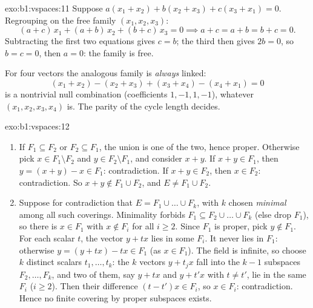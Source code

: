 \begin{solution}{exo:b1:vspaces:11}
Suppose $a(x_1 + x_2) + b(x_2 + x_3) + c(x_3 + x_1) = 0$.
Regrouping on the free family $(x_1, x_2, x_3)$:
\[
(a + c)\,x_1 + (a + b)\,x_2 + (b + c)\,x_3 = 0
\implies a + c = a + b = b + c = 0 .
\]
Subtracting the first two equations gives $c = b$; the third then
gives $2b = 0$, so $b = c = 0$, then $a = 0$: the family is free.

For four vectors the analogous family is \emph{always} linked:
\[
(x_1 + x_2) - (x_2 + x_3) + (x_3 + x_4) - (x_4 + x_1) = 0
\]
is a nontrivial null combination (coefficients $1, -1, 1, -1$),
whatever $(x_1, x_2, x_3, x_4)$ is. The parity of the cycle length
decides.
\end{solution}

\begin{solution}{exo:b1:vspaces:12}
\begin{enumerate}
  \item If $F_1 \subseteq F_2$ or $F_2 \subseteq F_1$, the union
        is one of the two, hence proper. Otherwise pick $x \in F_1
        \setminus F_2$ and $y \in F_2 \setminus F_1$, and consider
        $x + y$. If $x + y \in F_1$, then $y = (x + y) - x \in
        F_1$: contradiction. If $x + y \in F_2$, then $x \in F_2$:
        contradiction. So $x + y \notin F_1 \cup F_2$, and $E \neq
        F_1 \cup F_2$.
  \item Suppose for contradiction that $E = F_1 \cup \dots \cup
        F_k$, with $k$ chosen \emph{minimal} among all such
        coverings. Minimality forbids $F_1 \subseteq F_2 \cup
        \dots \cup F_k$ (else drop $F_1$), so there is $x \in F_1$
        with $x \notin F_i$ for all $i \geq 2$. Since $F_1$ is
        proper, pick $y \notin F_1$. For each scalar $t$, the
        vector $y + t x$ lies in some $F_i$. It never lies in
        $F_1$: otherwise $y = (y + tx) - tx \in F_1$ (as $x \in
        F_1$). The field is infinite, so choose $k$ distinct
        scalars $t_1, \dots, t_k$: the $k$ vectors $y + t_j x$
        fall into the $k - 1$ subspaces $F_2, \dots, F_k$, and two
        of them, say $y + t x$ and $y + t' x$ with $t \neq t'$,
        lie in the same $F_i$ ($i \geq 2$). Then their difference
        $(t - t')x \in F_i$, so $x \in F_i$: contradiction. Hence
        no finite covering by proper subspaces exists.
\end{enumerate}
\end{solution}

